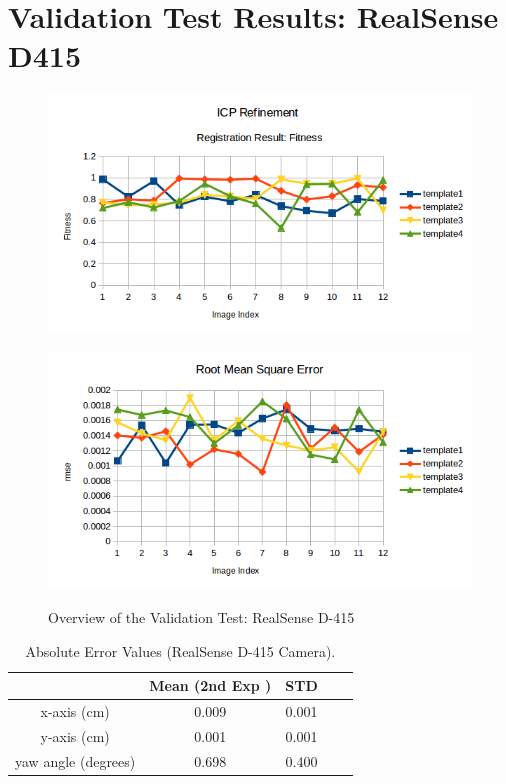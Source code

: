 \appendix
\chapter*{Validation Test Results: RealSense D415}
\label{chap:rsd415}
\begin{figure}[htp]
\begin{center}
{
  \includegraphics[clip,width=0.7\columnwidth]{figures/newreal_fitness.png}
}
\end{center}
\begin{center}
{
  \includegraphics[clip,width=0.7\columnwidth]{figures/newreal_rmse.png}
}
\end{center}
\caption{Overview of the Validation Test: RealSense D-415}
\label{setupsystem1}
\end{figure}



\begin{table}[ht]
\renewcommand{\arraystretch}{1.3}
\caption{Absolute Error Values (RealSense D-415 Camera).}
\label{absolute}
\centering
\begin{tabular}{|c||c||c||c||c|}
\hline
  & Mean (2nd Exp )& STD \\
\hline
x-axis (cm) & 0.009 & 0.001
 \\
\hline
y-axis (cm) & 0.001 & 0.001  \\
\hline
yaw angle (degrees)& 0.698 & 0.400 \\
\hline
\hline
\end{tabular}
\end{table}

